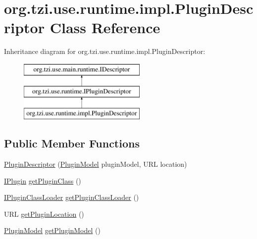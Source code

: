 \hypertarget{classorg_1_1tzi_1_1use_1_1runtime_1_1impl_1_1_plugin_descriptor}{\section{org.\-tzi.\-use.\-runtime.\-impl.\-Plugin\-Descriptor Class Reference}
\label{classorg_1_1tzi_1_1use_1_1runtime_1_1impl_1_1_plugin_descriptor}
}
Inheritance diagram for org.\-tzi.\-use.\-runtime.\-impl.\-Plugin\-Descriptor\-:\begin{figure}[H]
\begin{center}
\leavevmode
\includegraphics[height=3.000000cm]{classorg_1_1tzi_1_1use_1_1runtime_1_1impl_1_1_plugin_descriptor}
\end{center}
\end{figure}
\subsection*{Public Member Functions}
\begin{DoxyCompactItemize}
\item 
\hyperlink{classorg_1_1tzi_1_1use_1_1runtime_1_1impl_1_1_plugin_descriptor_ab6c4872f6354f3c93fc6618bd227df65}{Plugin\-Descriptor} (\hyperlink{classorg_1_1tzi_1_1use_1_1runtime_1_1model_1_1_plugin_model}{Plugin\-Model} plugin\-Model, U\-R\-L location)
\item 
\hyperlink{interfaceorg_1_1tzi_1_1use_1_1runtime_1_1_i_plugin}{I\-Plugin} \hyperlink{classorg_1_1tzi_1_1use_1_1runtime_1_1impl_1_1_plugin_descriptor_affb8a58775882e6643f0580cca34cf95}{get\-Plugin\-Class} ()
\item 
\hyperlink{interfaceorg_1_1tzi_1_1use_1_1runtime_1_1_i_plugin_class_loader}{I\-Plugin\-Class\-Loader} \hyperlink{classorg_1_1tzi_1_1use_1_1runtime_1_1impl_1_1_plugin_descriptor_ad8b54f39ec37da29f609a8046492df86}{get\-Plugin\-Class\-Loader} ()
\item 
U\-R\-L \hyperlink{classorg_1_1tzi_1_1use_1_1runtime_1_1impl_1_1_plugin_descriptor_aebb79131519272c5d82aed4561e5b42d}{get\-Plugin\-Location} ()
\item 
\hyperlink{classorg_1_1tzi_1_1use_1_1runtime_1_1model_1_1_plugin_model}{Plugin\-Model} \hyperlink{classorg_1_1tzi_1_1use_1_1runtime_1_1impl_1_1_plugin_descriptor_aa09e269ebd79508f22339b5688c5cd44}{get\-Plugin\-Model} ()
\end{DoxyCompactItemize}


